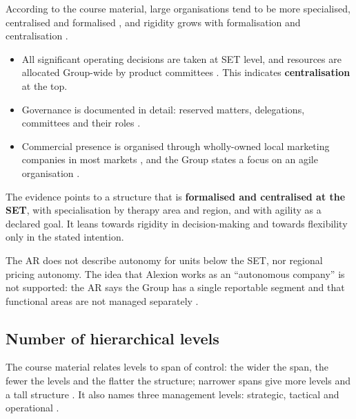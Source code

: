 According to the course material, large organisations tend to be more specialised, centralised and formalised \cite[p.~11]{ORG}, and rigidity grows with formalisation \cite[p.~9]{ORG} and centralisation \cite[p.~7]{ORG}.

\begin{itemize}
\item All significant operating decisions are taken at SET level, and resources are allocated Group-wide by product committees \cite[p.~147]{AR}. This indicates \textbf{centralisation} at the top.
\item Governance is documented in detail: reserved matters, delegations, committees and their roles \cite[pp.~67, 71]{AR}.
\item Commercial presence is organised through wholly-owned local marketing companies in most markets \cite[p.~32]{AR}, and the Group states a focus on an agile organisation \cite[p.~11]{AR}.
\end{itemize}

\begin{analysis}
The evidence points to a structure that is \textbf{formalised and centralised at the SET}, with specialisation by therapy area and region, and with agility as a declared goal. It leans towards rigidity in decision-making and towards flexibility only in the stated intention.
\end{analysis}

\begin{sourceslimit}
The AR does not describe autonomy for units below the SET, nor regional pricing autonomy. The idea that Alexion works as an ``autonomous company'' is not supported: the AR says the Group has a single reportable segment and that functional areas are not managed separately \cite[p.~147]{AR}.
\end{sourceslimit}

\subsection{Number of hierarchical levels}

The course material relates levels to span of control: the wider the span, the fewer the levels and the flatter the structure; narrower spans give more levels and a tall structure \cite[pp.~8--9]{ORG}. It also names three management levels: strategic, tactical and operational \cite[p.~7]{ORG}.

